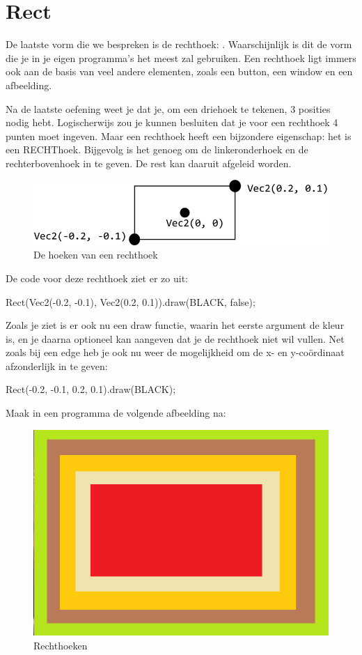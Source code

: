 \section{Rect}
De laatste vorm die we bespreken is de rechthoek: . Waarschijnlijk is dit de vorm die je in je eigen programma's het meest zal gebruiken. Een rechthoek ligt immers ook aan de basis van veel andere elementen, zoals een button, een window en een afbeelding.

Na de laatste oefening weet je dat je, om een driehoek te tekenen, 3 posities nodig hebt. Logischerwijs zou je kunnen besluiten dat je voor een rechthoek 4 punten moet ingeven. Maar een rechthoek heeft een bijzondere eigenschap: het is een RECHThoek. Bijgevolg is het genoeg om de linkeronderhoek en de rechterbovenhoek in te geven. De rest kan daaruit afgeleid worden.

\begin{figure}[h]
\centering
\includegraphics[width=0.8\linewidth]{images/rectangle.png}
\caption[]{De hoeken van een rechthoek}
\label{fig:rect}
\end{figure}

De code voor deze rechthoek ziet er zo uit:

\begin{code}
Rect(Vec2(-0.2, -0.1), Vec2(0.2, 0.1)).draw(BLACK, false);
\end{code}

Zoals je ziet is er ook nu een draw functie, waarin het eerste argument de kleur is, en je daarna optioneel kan aangeven dat je de rechthoek niet wil vullen. Net zoals bij een edge heb je ook nu weer de mogelijkheid om de x- en y-co\"ordinaat afzonderlijk in te geven:

\begin{code}
Rect(-0.2, -0.1, 0.2, 0.1).draw(BLACK);
\end{code}

\begin{exercise}
Maak in een programma de volgende afbeelding na:

\begin{figure}[h]
\centering
\includegraphics[width=0.4\linewidth]{images/nested_rectangles.png}
\caption[]{Rechthoeken}
\label{fig:nested_rect}
\end{figure}
\end{exercise}

